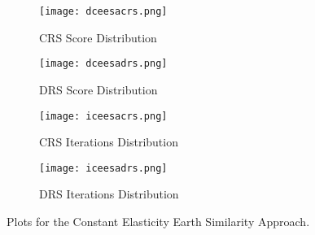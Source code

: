 \documentclass[9pt]{article}
\begin{document}
\begin{figure}
  \centering
  \begin{subfigure}[b]{0.4\textwidth}
    \texttt{[image: dceesacrs.png]}
    \caption{CRS Score Distribution}\label{fig:distcecrs}
  \end{subfigure}
  \quad
  \begin{subfigure}[b]{0.4\textwidth}
    \texttt{[image: dceesadrs.png]}
    \caption{DRS Score Distribution}\label{fig:distcedrs}
  \end{subfigure}

  \begin{subfigure}[b]{0.4\textwidth}
    \texttt{[image: iceesacrs.png]}
    \caption{CRS Iterations Distribution}\label{fig:itercecrs}
  \end{subfigure}
  \quad
  \begin{subfigure}[b]{0.4\textwidth}
    \texttt{[image: iceesadrs.png]}
    \caption{DRS Iterations Distribution}\label{fig:itercedrs}
  \end{subfigure}
  \caption{Plots for the Constant Elasticity Earth Similarity Approach.}\label{fig:ceesa}
\end{figure}
\end{document}
